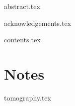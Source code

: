 \documentclass{bris}
\begin{document}

\maketitle

\frontmatter

\makedecl

{abstract.tex}

{acknowledgements.tex}

{contents.tex}
\cleardoublepage

\mainmatter


\chapter{Notes}

{tomography.tex}

\backmatter



\end{document}
